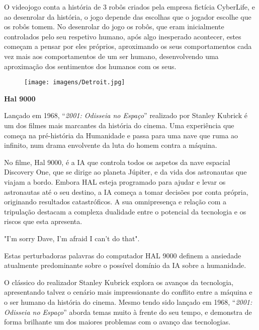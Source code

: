 \documentclass{report}
\begin{document}
O videojogo conta a história de 3 robôs criados pela empresa fictícia CyberLife, e ao desenrolar da história, o jogo depende das escolhas que o jogador escolhe que os robôs tomem.
No desenrolar do jogo os robôs, que eram inicialmente controlados pelo seu respetivo humano, após algo inesperado acontecer, estes começam a pensar por eles próprios, aproximando os seus comportamentos cada vez mais aos comportamentos de um ser humano, desenvolvendo uma aproximação dos sentimentos dos humanos com os seus.  

\vspace{40pt}
\begin{figure}[ht]
    \centering
    \texttt{[image: imagens/Detroit.jpg]}
    \caption{}
    \label{fig:detroit}
\end{figure}




\clearpage


\begin{center}
    \Huge{\textbf{Hal 9000}}    
\end{center}

\vspace{20pt}

Lançado em 1968, “\textit{2001: Odisseia no Espaço}” realizado por Stanley Kubrick é um dos filmes mais marcantes da história do cinema. 
Uma experiência que começa na pré-história da Humanidade e passa para uma nave que ruma ao infinito, num drama envolvente da luta do homem contra a máquina.
\vspace{5pt}

No filme, Hal 9000, é a \ac{IA} que controla todos os aspetos da nave espacial Discovery One, que se dirige ao planeta Júpiter, e da vida dos astronautas que viajam a bordo. Embora HAL esteja programado para ajudar e levar os astronautas até o seu destino, a \ac{IA} começa a tomar decisões por conta própria, originando resultados catastróficos. A sua omnipresença e relação com a tripulação destacam a complexa dualidade entre o potencial da tecnologia e os riscos que esta apresenta.
\vspace{5pt}

"I'm sorry Dave, I'm afraid I can't do that".

Estas perturbadoras palavras do computador HAL 9000 definem a ansiedade atualmente predominante sobre o possível domínio da \ac{IA} sobre a humanidade.
\vspace{5pt}

O clássico do realizador Stanley Kubrick explora os avanços da tecnologia, apresentando talvez o cenário mais impressionante do conflito entre a máquina e o ser humano da história do cinema. Mesmo tendo sido lançado em 1968, “\textit{2001: Odisseia no Espaço}” aborda temas muito à frente do seu tempo, e demonstra de forma brilhante um dos maiores problemas com o avanço das tecnologias.
\vspace{40pt}
\end{document}
